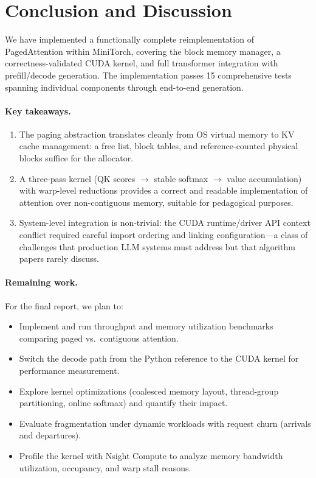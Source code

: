 \documentclass{article}
\begin{document}
\section{Conclusion and Discussion}
\label{sec:conclusion}

We have implemented a functionally complete reimplementation of PagedAttention within MiniTorch, covering the block memory manager, a correctness-validated CUDA kernel, and full transformer integration with prefill/decode generation.
The implementation passes 15 comprehensive tests spanning individual components through end-to-end generation.

\paragraph{Key takeaways.}
\begin{enumerate}
    \item The paging abstraction translates cleanly from OS virtual memory to KV cache management: a free list, block tables, and reference-counted physical blocks suffice for the allocator.
    \item A three-pass kernel (QK scores $\to$ stable softmax $\to$ value accumulation) with warp-level reductions provides a correct and readable implementation of attention over non-contiguous memory, suitable for pedagogical purposes.
    \item System-level integration is non-trivial: the CUDA runtime/driver API context conflict required careful import ordering and linking configuration---a class of challenges that production LLM systems must address but that algorithm papers rarely discuss.
\end{enumerate}

\paragraph{Remaining work.}
For the final report, we plan to:
\begin{itemize}
    \item Implement and run throughput and memory utilization benchmarks comparing paged vs.\ contiguous attention.
    \item Switch the decode path from the Python reference to the CUDA kernel for performance measurement.
    \item Explore kernel optimizations (coalesced memory layout, thread-group partitioning, online softmax) and quantify their impact.
    \item Evaluate fragmentation under dynamic workloads with request churn (arrivals and departures).
    \item Profile the kernel with Nsight Compute to analyze memory bandwidth utilization, occupancy, and warp stall reasons.
\end{itemize}
\end{document}
